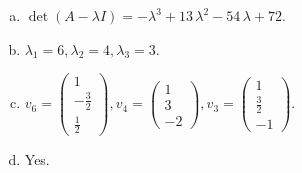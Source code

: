\begin{questions}
\begin{solution}
\begin{enumerate}[(a)]
\item $\det(A-\lambda I)=-{\lambda}^{3} + 13 \, {\lambda}^{2} - 54 \, {\lambda} + 72$.
\item ${\lambda}_1=6, {\lambda}_2=4, {\lambda}_3=3$.
\item $v_{6}=\left(\begin{array}{r}
1 \\
-\frac{3}{2} \\
\frac{1}{2}
\end{array}\right), v_{4}=\left(\begin{array}{r}
1 \\
3 \\
-2
\end{array}\right), v_{3}=\left(\begin{array}{r}
1 \\
\frac{3}{2} \\
-1
\end{array}\right)$.
\item Yes.
\end{enumerate}
\end{solution}

\end{questions}

\newpage


\begin{center}
\end{center}

